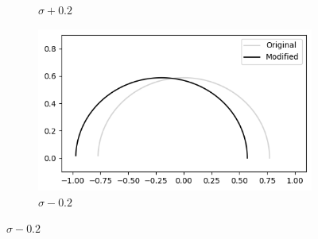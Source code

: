 \documentclass[a4paper]{report}
\begin{document}
\begin{figure}[ht]
\begin{subfigure}{.3\linewidth}
      \caption{$\sigma + 0.2$}
      \label{fig:positive_sigma}
    \end{subfigure}\hfill
    \begin{subfigure}{.3\linewidth}
      \includegraphics[width=\linewidth]{images/deformations/negative_sigma.png}
      \caption{$\sigma - 0.2$}
        \label{fig:negative_sigma}
    \end{subfigure}

    \medskip


\end{figure}
\end{document}
